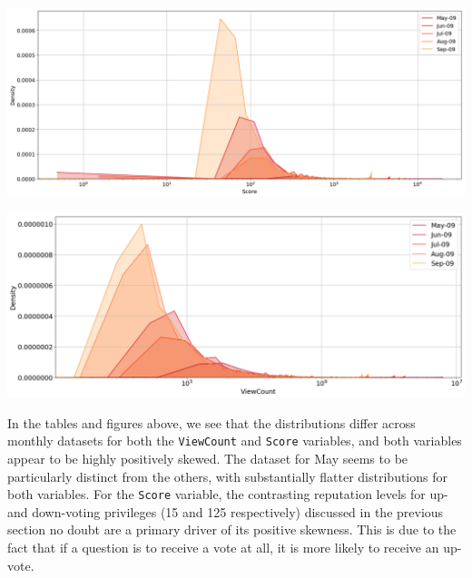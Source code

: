 \documentclass[11pt,preprint, authoryear]{article}
\let\origfigure\figure
\let\endorigfigure\endfigure
\renewenvironment{figure}[1][2] {
    \expandafter\origfigure\expandafter[H]
} {
    \endorigfigure
}
\begin{document}
\begin{figure}
\caption{\textbf{Score Variable Density Plot}}
\label{fig:score_dens}

\begin{center}\includegraphics[width=1\linewidth]{../../01-python-code/00-workspace/01-eda/01-graphs/score-sgl-density-plot} \end{center}
\end{figure}

\normalsize

\footnotesize

\begin{figure}
\caption{\textbf{ViewCount Variable Density Plot}}
\label{fig:viewc_dens}

\begin{center}\includegraphics[width=1\linewidth]{../../01-python-code/00-workspace/01-eda/01-graphs/viewcount-sgl-density-plot} \end{center}
\end{figure}

\normalsize

In the tables and figures above, we see that the distributions differ
across monthly datasets for both the \texttt{ViewCount} and
\texttt{Score} variables, and both variables appear to be highly
positively skewed. The dataset for May seems to be particularly distinct
from the others, with substantially flatter distributions for both
variables. For the \texttt{Score} variable, the contrasting reputation
levels for up- and down-voting privileges (15 and 125 respectively)
discussed in the previous section no doubt are a primary driver of its
positive skewness. This is due to the fact that if a question is to
receive a vote at all, it is more likely to receive an up-vote.
\end{document}
